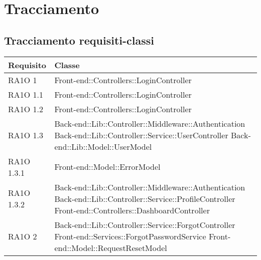 \section{Tracciamento}
\subsection{Tracciamento requisiti-classi}

\begin{center}
      \bgroup
      \def\arraystretch{1.8}
      \begin{longtable}{ | p{3cm} | p{11cm} | }
    \hline
    
      \cellcolor[gray]{0.9} \textbf{Requisito} & \cellcolor[gray]{0.9} \textbf{Classe} \\ \hline
      
	RA1O 1 & Front-end::Controllers::LoginController \newline  \\ \hline 
	RA1O 1.1 & Front-end::Controllers::LoginController \newline  \\ \hline 
	RA1O 1.2 & Front-end::Controllers::LoginController \newline  \\ \hline      

	RA1O 1.3 & Back-end::Lib::Controller::Middleware::Authentication  \newline Back-end::Lib::Controller::Service::UserController \newline Back-end::Lib::Model::UserModel \\ \hline  
    
    RA1O 1.3.1 & Front-end::Model::ErrorModel \newline  \\ \hline 
           
    RA1O 1.3.2 & Back-end::Lib::Controller::Middleware::Authentication \newline
        			Back-end::Lib::Controller::Service::ProfileController \newline
        			Front-end::Controllers::DashboardController \newline  \\ \hline 
        				
        				     
    RA1O 2 & Back-end::Lib::Controller::Service::ForgotController \newline
    			Front-end::Services::ForgotPasswordService \newline
    			Front-end::Model::RequestResetModel  \newline  \\ \hline   
    			   

\end{longtable}
\end{center}
